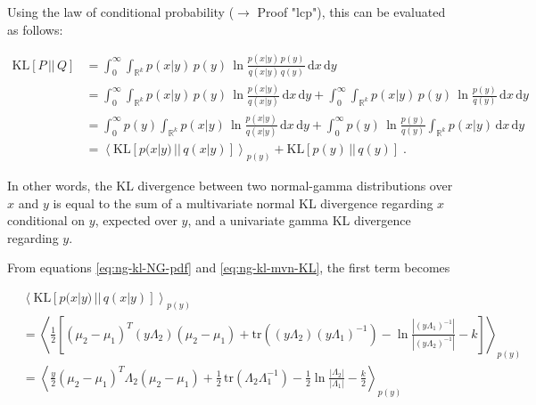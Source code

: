\documentclass[a4paper,12pt]{book}
\begin{document}
Using the law of conditional probability ($\rightarrow$ Proof "lcp"), this can be evaluated as follows:

\begin{equation} \label{eq:ng-kl-NG-KL1}
\begin{split}
\mathrm{KL}[P\,||\,Q] &= \int_{0}^{\infty} \int_{\mathbb{R}^k} p(x|y) \, p(y) \, \ln \frac{p(x|y) \, p(y)}{q(x|y) \, q(y)} \, \mathrm{d}x \, \mathrm{d}y \\
&= \int_{0}^{\infty} \int_{\mathbb{R}^k} p(x|y)\, p(y) \, \ln \frac{p(x|y)}{q(x|y)} \, \mathrm{d}x \, \mathrm{d}y + \int_{0}^{\infty} \int_{\mathbb{R}^k} p(x|y)\, p(y) \, \ln \frac{p(y)}{q(y)} \, \mathrm{d}x \, \mathrm{d}y \\
&= \int_{0}^{\infty} p(y) \int_{\mathbb{R}^k} p(x|y) \, \ln \frac{p(x|y)}{q(x|y)} \, \mathrm{d}x \, \mathrm{d}y + \int_{0}^{\infty} p(y) \, \ln \frac{p(y)}{q(y)} \int_{\mathbb{R}^k} p(x|y) \, \mathrm{d}x \, \mathrm{d}y \\
&= \left\langle \mathrm{KL}[p(x|y)\,||\,q(x|y)] \right\rangle_{p(y)} + \mathrm{KL}[p(y)\,||\,q(y)] \; .
\end{split}
\end{equation}

In other words, the KL divergence between two normal-gamma distributions over $x$ and $y$ is equal to the sum of a multivariate normal KL divergence regarding $x$ conditional on $y$, expected over $y$, and a univariate gamma KL divergence regarding $y$.

\vspace{1em}
From equations \eqref{eq:ng-kl-NG-pdf} and \eqref{eq:ng-kl-mvn-KL}, the first term becomes

\begin{equation} \label{eq:ng-kl-exp-mvn-KL-s1}
\begin{split}
&\left\langle \mathrm{KL}[p(x|y)\,||\,q(x|y)] \right\rangle_{p(y)} \\
&= \left\langle \frac{1}{2} \left[ (\mu_2 - \mu_1)^T (y \Lambda_2) (\mu_2 - \mu_1) + \mathrm{tr}\left( (y \Lambda_2) (y \Lambda_1)^{-1} \right) - \ln \frac{|(y \Lambda_1)^{-1}|}{|(y \Lambda_2)^{-1}|} - k \right] \right\rangle_{p(y)} \\
&= \left\langle \frac{y}{2} (\mu_2 - \mu_1)^T \Lambda_2 (\mu_2 - \mu_1) + \frac{1}{2} \, \mathrm{tr}(\Lambda_2 \Lambda_1^{-1}) - \frac{1}{2} \ln \frac{|\Lambda_2|}{|\Lambda_1|} - \frac{k}{2} \right\rangle_{p(y)} \\
\end{split}
\end{equation}
\end{document}
